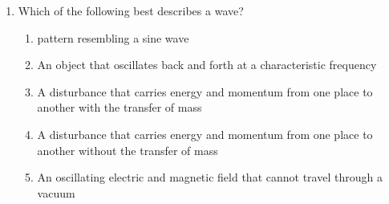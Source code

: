 \documentclass{../../../oss-apphys}
\begin{document}
\begin{multicols}{2}
\begin{enumerate}[leftmargin=18pt,resume]
  \item Which of the following best describes a wave?
    \begin{enumerate}[nosep,leftmargin=18pt,label=(\Alph*)]
    \item pattern resembling a sine wave
    \item An object that oscillates back and forth at a characteristic frequency
    \item A disturbance that carries energy and momentum from one place to
      another with the transfer of mass
    \item A disturbance that carries energy and momentum from one place to
      another without the transfer of mass
    \item An oscillating electric and magnetic field that cannot travel through
      a vacuum
  \end{enumerate}
    \columnbreak
    
    
    


\end{enumerate}
\end{multicols}
\end{document}
